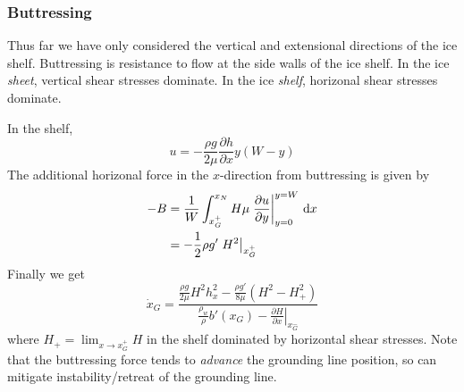 \documentclass{jknotes}
\begin{document}
\subsubsection{Buttressing}
Thus far we have only considered the vertical and extensional directions of
the ice shelf. Buttressing is resistance to flow at the side walls of the ice
shelf. In the ice \emph{sheet}, vertical shear stresses dominate. In the ice
\emph{shelf}, horizonal shear stresses dominate.
\begin{center}
\end{center}

In the shelf,
\begin{equation}
	u = -\frac{\rho g}{2\mu}\frac{\partial h}{\partial x} y(W-y)
\end{equation}
The additional horizonal force in the $x$-direction from buttressing is given
by
\begin{align}
	-B &= \frac{1}{W}\int_{x_G^+}^{x_N} H\mu\left.\frac{\partial u}{\partial
	y}\right|_{y=0}^{y=W} \,
	\diffd x \\
	   &= -\frac{1}{2}\rho g' \left.H^2\right|_{x_G^+}
\end{align}
Finally we get
\begin{equation}
	\dot{x}_G = \frac{\frac{\rho g}{2\mu} H^2 h_x^2 - \frac{\rho g'}{8\mu}
	(H^2-H_+^2)}{\frac{\rho_w}{\rho}b'(x_G) - \left.\frac{\partial H}{\partial
	x}\right|_{x_G^-}}
\end{equation}
where $H_+ = \lim_{x\to x_G^+} H$ in the shelf dominated by horizontal shear
stresses. Note that the buttressing force tends to \emph{advance} the
grounding line position, so can mitigate instability/retreat of the grounding
line.
\end{document}
